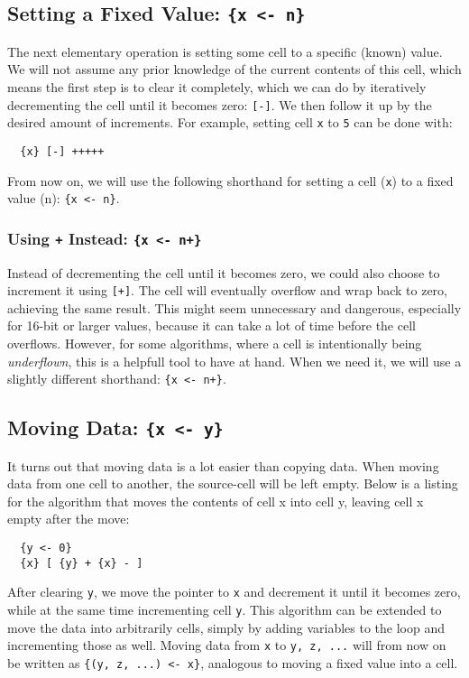 \tocless\subsection{Setting a Fixed Value: \texttt{\{x <- n\}}}
The next elementary operation is setting some cell to a specific (known) value. We will not assume any prior knowledge of the current contents of this cell, which means the first step is to clear it completely, which we can do by iteratively decrementing the cell until it becomes zero: \texttt{[-]}. We then follow it up by the desired amount of increments. For example, setting cell \texttt{x} to \texttt{5} can be done with:
\begin{lstlisting}
  {x} [-] +++++
\end{lstlisting}
From now on, we will use the following shorthand for setting a cell (\texttt{x}) to a fixed value (n): \texttt{\{x <- n\}}.
\tocless\subsubsection{Using \texttt{+} Instead: \texttt{\{x <- n+\}}}
Instead of decrementing the cell until it becomes zero, we could also choose to increment it using \texttt{[+]}. The cell will eventually overflow and wrap back to zero, achieving the same result. This might seem unnecessary and dangerous, especially for 16-bit or larger values, because it can take a lot of time before the cell overflows. However, for some algorithms, where a cell is intentionally being \emph{underflown}, this is a helpfull tool to have at hand. When we need it, we will use a slightly different shorthand: \texttt{\{x <- n+\}}.

\tocless\subsection{Moving Data: \texttt{\{x <- y\}}}
It turns out that moving data is a lot easier than copying data. When moving data from one cell to another, the source-cell will be left empty. Below is a listing for the algorithm that moves the contents of cell x into cell y, leaving cell x empty after the move:
\begin{lstlisting}
  {y <- 0} 
  {x} [ {y} + {x} - ]
\end{lstlisting}
After clearing \texttt{y}, we move the pointer to \texttt{x} and decrement it until it becomes zero, while at the same time incrementing cell \texttt{y}. This algorithm can be extended to move the data into arbitrarily cells, simply by adding variables to the loop and incrementing those as well. Moving data from \texttt{x} to \texttt{y, z, ...} will from now on be written as \texttt{\{(y, z, ...) <- x\}}, analogous to moving a fixed value into a cell.


